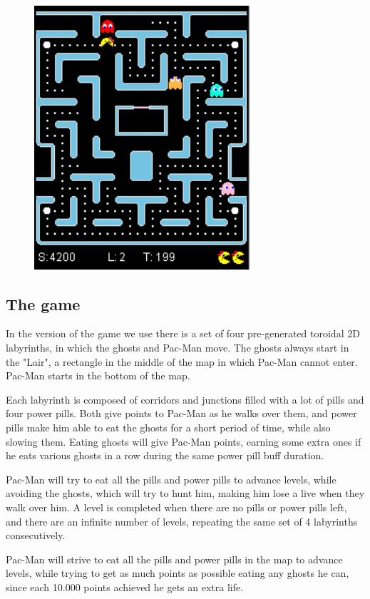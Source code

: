 \documentclass{llncs}
\newcommand{\paco}{Pac-Man }
\begin{document}
\begin{figure}[H]
	\centering
	\includegraphics[width=8cm]{images/PacMan_ss.png}
\end{figure}


\subsection{The game}

In the version of the game we use\cite{mspacmangithub} there is a set of four pre-generated toroidal 2D labyrinths, in which the ghosts and \paco move. The ghosts always start in the "Lair", a rectangle in the middle of the map in which \paco cannot enter. \paco starts in the bottom of the map.

Each labyrinth is composed of corridors and junctions filled with a lot of pills and four power pills. Both give points to \paco as he walks over them, and power pills make him able to eat the ghosts for a short period of time, while also slowing them. Eating ghosts will give \paco points, earning some extra ones if he eats various ghosts in a row during the same power pill buff duration.

\paco will try to eat all the pills and power pills to advance levels, while avoiding the ghosts, which will try to hunt him, making him lose a live when they walk over him. A level is completed when there are no pills or power pills left, and there are an infinite number of levels, repeating the same set of 4 labyrinths consecutively.

\paco will strive to eat all the pills and power pills in the map to advance levels, while trying to get as much points as possible eating any ghosts he can, since each 10.000 points achieved he gets an extra life.
\end{document}
